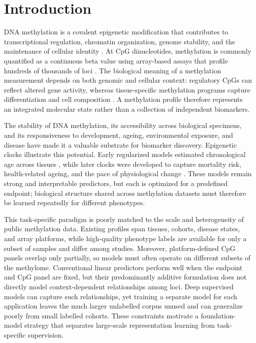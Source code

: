 \section{Introduction}

DNA methylation is a covalent epigenetic modification that contributes to transcriptional
regulation, chromatin organization, genome stability, and the maintenance of cellular identity
\citep{Jones2012}.
At CpG dinucleotides, methylation is commonly quantified as a continuous beta value using
array-based assays that profile hundreds of thousands of loci \citep{Bibikova2011,Pidsley2016}.
The biological meaning of a methylation measurement depends on both genomic and cellular
context: regulatory CpGs can reflect altered gene activity, whereas tissue-specific methylation
programs capture differentiation and cell composition \citep{Roadmap2015}. A
methylation profile therefore represents an integrated molecular state rather than a collection
of independent biomarkers.

The stability of DNA methylation, its accessibility across biological specimens, and its
responsiveness to development, ageing, environmental exposure, and disease have made it a
valuable substrate for biomarker discovery. Epigenetic clocks illustrate this potential. Early
regularized models estimated chronological age across tissues \citep{Horvath2013}, while later
clocks were developed to capture mortality risk, health-related ageing, and the pace of
physiological change \citep{Levine2018,Lu2019,Belsky2022,HigginsChen2022}. These models remain
strong and interpretable predictors, but each is optimized for a predefined endpoint; biological
structure shared across methylation datasets must therefore be learned repeatedly for different
phenotypes.

This task-specific paradigm is poorly matched to the scale and heterogeneity of public
methylation data. Existing profiles span tissues, cohorts, disease states, and array platforms,
while high-quality phenotype labels are available for only a subset of samples and differ among
studies. Moreover, platform-defined CpG panels overlap only partially, so models must often
operate on different subsets of the methylome. Conventional linear predictors perform well when
the endpoint and CpG panel are fixed, but their predominantly additive formulation does not
directly model context-dependent relationships among loci. Deep supervised models can capture
such relationships, yet training a separate model for each application leaves the much larger
unlabelled corpus unused and can generalize poorly from small labelled cohorts. These constraints
motivate a foundation-model strategy that separates large-scale representation learning from
task-specific supervision.

